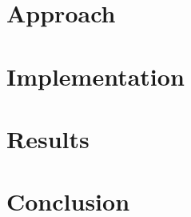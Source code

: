\documentclass[11pt, journal]{IEEEtran}
\begin{document}
\section{Approach}


\section{Implementation}


\section{Results}


\section{Conclusion}

\end{document}
